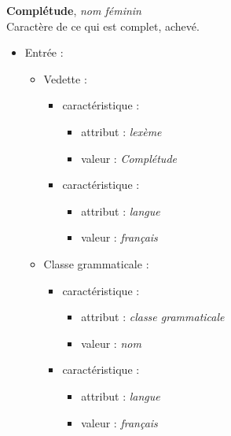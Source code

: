 \documentclass[10pt]{report}
\newcommand{\entité}[1]{\textcolor{blue!60!black}{#1}}
\newcommand{\caractéristique}[1]{\textcolor{green!60!black}{#1}}
\newcommand{\entitétechnique}[1]{\textcolor{blue!50!red}{#1}}
\begin{document}
\begin{figure}[h]
	\centering
	\begin{minipage}{0.3\linewidth}
    \textbf{Complétude}, \textit{nom féminin}\\    
    Caractère de ce qui est complet, achevé.
	\end{minipage}%
	\begin{minipage}{0.5\linewidth}
    \begin{itemize}
    	\item \entité{Entrée} :
    	\begin{itemize}
        \item \entité{Vedette} :
        \begin{itemize}
        	\item \entité{caractéristique} :
        	\begin{itemize}
            \item \caractéristique{attribut} : \textit{lexème}
            \item \caractéristique{valeur} : \textit{Complétude}
        	\end{itemize}
            \item \entité{caractéristique} :
        	\begin{itemize}
            \item \caractéristique{attribut} : \textit{langue}
            \item \caractéristique{valeur} : \textit{français}
        	\end{itemize}
        \end{itemize}
        \item \entité{Classe grammaticale} :
        \begin{itemize}
        	\item \entité{caractéristique} :
        	\begin{itemize}
            \item \caractéristique{attribut} : \textit{classe grammaticale}
            \item \caractéristique{valeur} : \textit{nom}
        	\end{itemize}
        	\item \entité{caractéristique} :
        	\begin{itemize}
            \item \caractéristique{attribut} : \textit{langue}
            \item \caractéristique{valeur} : \textit{français}
        	\end{itemize}

\end{itemize}
\end{itemize}
\end{itemize}
\end{minipage}
\end{figure}
\end{document}
